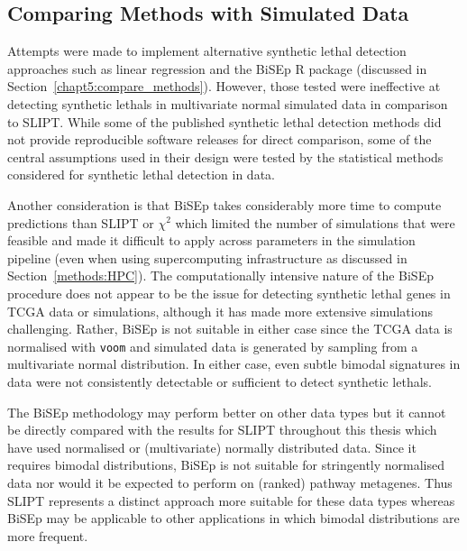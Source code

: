 \subsection{Comparing Methods with Simulated Data}

Attempts were made to implement alternative \gls{synthetic lethal} detection approaches such as linear regression and the \gls{BiSEp} R package (discussed in Section~\ref{chapt5:compare_methods}). However, those tested were ineffective at detecting \glspl{synthetic lethal} in multivariate normal simulated data in comparison to \gls{SLIPT}. While some of the published \gls{synthetic lethal} detection methods \citep{Jerby2014, Lu2015} did not provide reproducible software releases for direct comparison, some of the central assumptions used in their design were tested by the statistical methods considered for \gls{synthetic lethal} detection in  data.  

Another consideration is that \gls{BiSEp} takes considerably more time to compute predictions than \gls{SLIPT} or $\chi^2$ which limited the number of simulations that were feasible and made it difficult to apply across parameters in the simulation pipeline (even when using supercomputing infrastructure as discussed in Section~\ref{methods:HPC}). The computationally intensive nature of the \gls{BiSEp} procedure does not appear to be the issue for detecting \gls{synthetic lethal} genes in \gls{TCGA} data or simulations, although it has made more extensive simulations challenging. Rather, \gls{BiSEp} is not suitable in either case since the \gls{TCGA} data is normalised with \texttt{voom} \citep{limma} and simulated data is generated by sampling from a multivariate normal distribution. In either case, even subtle bimodal signatures in  data were not consistently detectable or sufficient to detect \glspl{synthetic lethal}.

The \gls{BiSEp} methodology may perform better on other data types but it cannot be directly compared with the results for \gls{SLIPT} throughout this thesis which have used normalised or (multivariate) normally distributed data. Since it requires bimodal distributions, \gls{BiSEp} is not suitable for stringently normalised  data nor would it be expected to perform on (ranked) pathway \glspl{metagene}. Thus \gls{SLIPT} represents a distinct approach more suitable for these data types whereas \gls{BiSEp} may be applicable to other applications in which bimodal distributions are more frequent.

